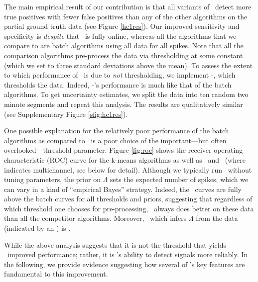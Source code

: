 The main empirical result of our contribution is that all variants of \smug\ detect more true positives with fewer false positives than any of the other algorithms on the partial ground truth data (see Figure \ref{hc1res}).  
Our improved sensitivity and specificity is \emph{despite} that \smug\ is fully online, whereas all the algorithms that we compare to are batch algorithms using all data for all spikes.   Note that all the comparison algorithms pre-process the data via thresholding at some constant (which we set to three standard deviations above the mean).  To assess the extent to which performance of \smug\ is due to \emph{not} thresholding, we implement -\smug, which thresholds the data.  Indeed, -\smug's performance is much like that of the batch algorithms.  To get uncertainty estimates, we split the data into ten random two minute segments and repeat this analysis. The results are qualitatively similar (see Supplementary Figure \ref{sfig:hc1res}).


One possible explanation for the relatively poor performance of the batch algorithms as compared to \smug\ is a poor choice of the important---but often overlooked---threshold parameter.  Figure \ref{fig:roc} shows the receiver operating characteristic (ROC) curve for the k-means algorithms as well as \smug\ and \smug\ (where  indicates multichannel, see below for detail).  Although we typically run \smug\ without tuning parameters, the prior on $\Lambda$ sets the expected number of spikes, which we can vary in a kind of ``empirical Bayes'' strategy.  Indeed, the \smug\ curves are fully above the batch curves for all thresholds and priors, suggesting that regardless of which threshold one chooses for pre-processing, \smug\ always does better on these data than all the competitor algorithms.  Moreover, \smug\ which infers $\Lambda$ from the data (indicated by an ) is .

While the above analysis suggests that it is not the threshold that yields \smug\ improved performance; rather, it is \smug's ability to detect signals more reliably.  In the following, we provide evidence suggesting how several of \smug's key features are fundamental to this improvement.


